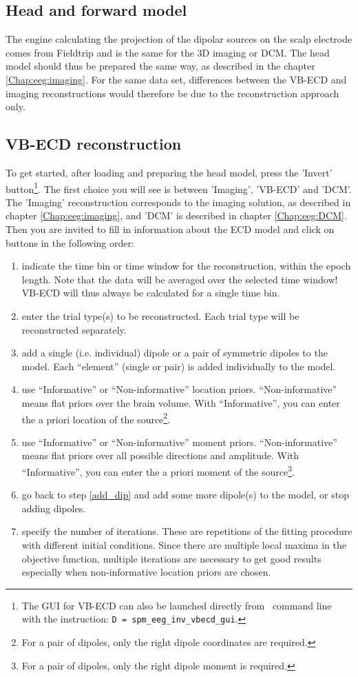\subsection{Head and forward model}
The engine calculating the projection of the dipolar sources on the scalp electrode comes from Fieldtrip and is the same for the 3D imaging or DCM. The head model should thus be prepared the same way, as described in the chapter \ref{Chap:eeg:imaging}. For the same data set, differences  between the VB-ECD and imaging reconstructions would therefore be due to the reconstruction approach only.

\subsection{VB-ECD reconstruction}
To get started, after loading and preparing the head model, press the 'Invert' button\footnote{The GUI for VB-ECD can also be launched directly from \matlab\ command line with the instruction: \texttt{D = spm\_eeg\_inv\_vbecd\_gui}.}. The first choice you will see is between 'Imaging', 'VB-ECD' and 'DCM'. The 'Imaging' reconstruction corresponds to the imaging solution, as described in chapter \ref{Chap:eeg:imaging}, and 'DCM' is described in chapter \ref{Chap:eeg:DCM}.
Then you are invited to fill in information about the ECD model and click on buttons in the following order:
\begin{enumerate}
\item indicate the time bin or time window for the reconstruction, within the epoch length. Note that the data will be averaged over the selected time window! VB-ECD will thus always be calculated for a single time bin.
\item enter the trial type(s) to be reconstructed. Each trial type will be reconstructed separately.
\item \label{add_dip} add a single (i.e. individual) dipole or a pair of symmetric dipoles to the model. Each ``element'' (single or pair) is added individually to the model.
\item use ``Informative'' or ``Non-informative'' location priors. ``Non-informative'' means flat priors over the brain volume. With ``Informative'', you can enter the a priori location of the source\footnote{For a pair of dipoles, only the right dipole coordinates are required.}.
\item use ``Informative'' or ``Non-informative'' moment priors. ``Non-informative'' means flat priors over all possible directions and amplitude. With ``Informative'', you can enter the a priori moment of the source\footnote{For a pair of dipoles, only the right dipole moment is required.}.
\item go back to step \ref{add_dip} and add some more dipole(s) to the model, or stop adding dipoles.
\item specify the number of iterations. These are repetitions of the fitting procedure with different initial conditions. Since there are multiple local maxima in the objective function, multiple iterations are necessary to get good results especially when non-informative location priors are chosen.
\end{enumerate}
